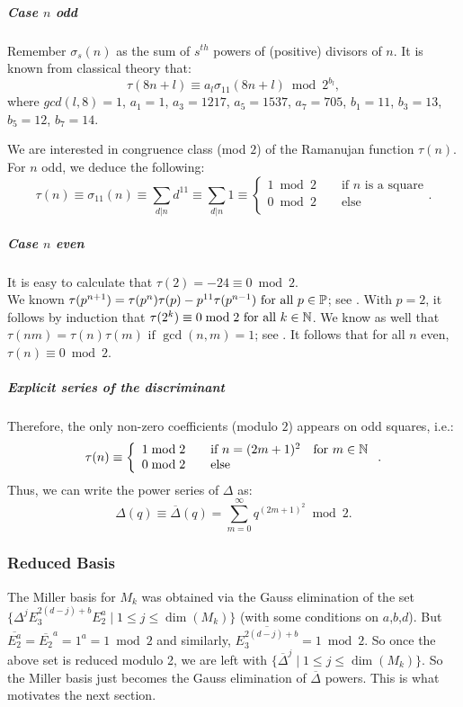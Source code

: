 \subparagraph{Case $n$ odd}
Remember $\sigma_s(n)$ as the sum of $s^{th}$ powers of (positive) divisors of $n$.
It is known from classical theory \cite[p.8]{kolberg} that:
$$\tau(8n+l) \equiv a_l \sigma_{11}(8n+l) \bmod {2^{b_l}}, $$
where $gcd(l,8)=1$, $a_1 = 1$, $a_3 = 1217$, $a_5 = 1537$, $a_7 = 705$, 
$b_1 = 11$, $b_3 = 13$, $b_5 = 12$, $b_7 = 14$.

We are interested in congruence class (mod $2$) of the Ramanujan function $\tau(n)$.
For $n$ odd, we deduce the following:
$$\tau(n) \equiv \sigma_{11}(n) \equiv \sum_{d | n} d^{11}
\equiv \sum_{d | n} 1 \equiv \left\lbrace
\begin{array}{ll}
1 \bmod 2 \qquad \text{if } n \text{ is a square}\\
0 \bmod 2 \qquad \text{else}\\
\end{array} \right..
$$
\subparagraph{Case $n$ even}
It is easy to calculate that $\tau(2) = -24 \equiv 0 \bmod 2$.\\
We known $\tau(p^{n+1}) = \tau(p^n)\tau(p) - p^{11}\tau(p^{n-1}) \text{ for all } p \in \mathbb{P}$; see \cite[p.97]{CourseInArithmetic}. With $p=2$, it follows by induction that $\tau(2^k) \equiv 0 \bmod 2 \text{ for all } k \in \mathbb{N}$.
We know as well that $\tau(nm) = \tau(n)\tau(m) \text{ if } \gcd(n,m)=1$; see \cite[p.97]{CourseInArithmetic}. It follows that for all $n$ even, $\tau(n) \equiv 0 \bmod 2$.
\subparagraph[Summary]{Explicit series of the discriminant}
\label{DeltaSeries}
Therefore, the only non-zero coefficients (modulo $2$) appears on odd squares, i.e.:
$$
\tau(n) \equiv \left\lbrace \begin{array}{ll}
1 \bmod 2 \qquad \text{if } n=(2m+1)^2 \quad \text{for } m \in \mathbb{N}\\
0 \bmod 2 \qquad \text{else} 
\end{array}\right..
$$
Thus, we can write the power series of $\Delta$ as:
\[
\Delta(q) \equiv \overline{\Delta}(q) = \sum_{m=0}^{\infty} q^{(2m+1)^2} \bmod 2.
\label{eq:Delta}
\]

\subsubsection{Reduced Basis}
The Miller basis for $M_k$ was obtained via the Gauss elimination of the set $\{ \Delta^jE_3^{2(d-j)+b}E_2^a \mid 1 \leq j \leq \dim(M_k) \}$ (with some conditions on $a$,$b$,$d$).
But $\overline{E_2^a} = \overline{E_2}^a = 1^a = 1 \bmod 2$ and similarly, $\overline{E_3^{2(d-j)+b}} = 1 \bmod 2$.
So once the above set is reduced modulo 2, we are left with $\{ \overline{\Delta}^j \mid 1 \leq j \leq \dim(M_k) \}$.
So the Miller basis just becomes the Gauss elimination of $\overline{\Delta}$ powers.
This is what motivates the next section.



